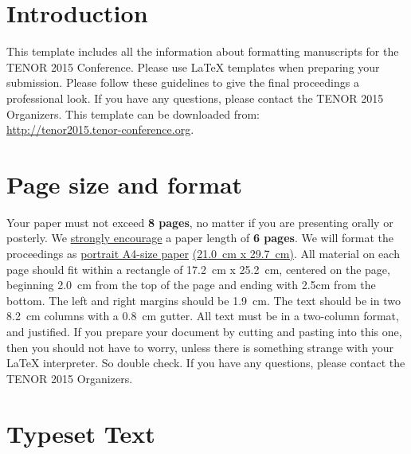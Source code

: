 \documentclass{article}
\title{\papertitle}
\begin{document}
%
\capstartfalse
\maketitle
\capstarttrue
%
\begin{abstract}
Place your abstract at the top left column on the first page.
Please write about 150-200 words that specifically highlight the purpose of your work,
its context, and provide a brief synopsis of your results.
Avoid equations in this part.
\end{abstract}
%

\section{Introduction}\label{sec:introduction}
This template includes all the information about formatting manuscripts for 
the TENOR 2015 Conference.
Please use \LaTeX{} templates when 
preparing your submission.
Please follow these guidelines to give the final proceedings a professional look.
If you have any questions, please contact the TENOR 2015 Organizers.
This template can be downloaded from:\\
\url{http://tenor2015.tenor-conference.org}.

\section{Page size and format}\label{sec:page_size}
Your paper must not exceed {\bf 8 pages},
no matter if you are presenting orally or posterly.
We \underline{strongly encourage}
a paper length of {\bf 6 pages}.
We will format the proceedings as
 \underline{portrait A4-size paper} \underline{(21.0~cm x 29.7~cm)}.
All material on each page should fit within a rectangle of 17.2~cm x 25.2~cm,
centered on the page, beginning 2.0~cm from the top of the page and ending 
with 2.5cm from the bottom.
The left and right margins should be 1.9~cm.
The text should be in two 8.2~cm columns with a 0.8~cm gutter.
All text must be in a two-column format, and justified.
If you prepare your document by cutting and pasting into this one,
then you should not have to worry, 
unless there is something strange with your \LaTeX{} interpreter.
So double check.
If you have any questions, please contact the TENOR 2015 Organizers.

\section{Typeset Text}\label{sec:typeset_text}
\end{document}
